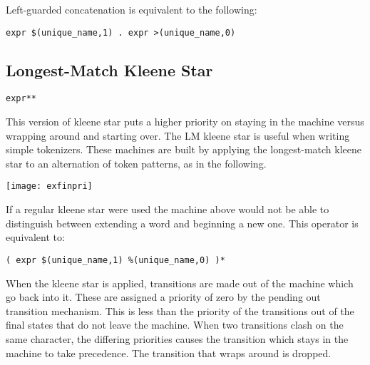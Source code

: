 \documentclass[letterpaper,11pt,oneside]{book}
\newcommand{\verbspace}{\vspace{10pt}}
\begin{document}
Left-guarded concatenation is equivalent to the following:

\verbspace
\begin{verbatim}
expr $(unique_name,1) . expr >(unique_name,0)
\end{verbatim}
\verbspace

\subsection{Longest-Match Kleene Star}
\label{longest_match_kleene_star}

\verb|expr**| 
\verbspace

This version of kleene star puts a higher priority on staying in the
machine versus wrapping around and starting over. The LM kleene star is useful
when writing simple tokenizers.  These machines are built by applying the
longest-match kleene star to an alternation of token patterns, as in the
following.

\verbspace

% GENERATE: exfinpri
% OPT: -p
% %%{
% machine exfinpri;
% action A {}
% action B {}
\begin{comment}
\begin{verbatim}
# Repeat tokens, but make sure to get the longest match.
main := (
    lower ( lower | digit )* %
    digit+ %
    ' '
)**;
\end{verbatim}
\end{comment}

\begin{center}
\texttt{[image: exfinpri]}
\end{center}

If a regular kleene star were used the machine above would not be able to
distinguish between extending a word and beginning a new one.  This operator is
equivalent to:

\verbspace
\begin{verbatim}
( expr $(unique_name,1) %(unique_name,0) )*
\end{verbatim}
\verbspace

When the kleene star is applied, transitions are made out of the machine which
go back into it. These are assigned a priority of zero by the pending out
transition mechanism. This is less than the priority of the transitions out of
the final states that do not leave the machine. When two transitions clash on
the same character, the differing priorities causes the transition which
stays in the machine to take precedence.  The transition that wraps around is
dropped.
\end{document}
